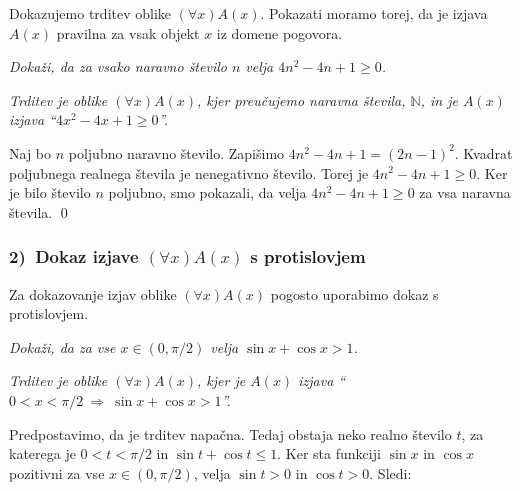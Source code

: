 \documentclass[12pt,a4paper]{article}
\def\sledi {{~\Rightarrow~}}
\def\zgled{\noindent{\bf\color{blue} Zgled: }}
\begin{document}
Dokazujemo trditev oblike $(\forall x)A(x)$.  Pokazati moramo torej, da je izjava $A(x)$
pravilna za vsak objekt $x$ iz domene pogovora.

\medskip
\zgled
{\it Dokaži, da za vsako naravno število $n$ velja $4n^2-4n+1\ge 0$.
}

\medskip {}

{\it Trditev je oblike $(\forall x)A(x)$, kjer preučujemo naravna števila, $\mathbb{N}$, in je $A(x)$ izjava ``$4x^2 -4x+1 \ge 0$''.}

Naj bo $n$ poljubno naravno število. Zapišimo $4n^2 -4n+1 = (2n-1)^2$.
Kvadrat poljubnega realnega števila je nenegativno število.
Torej je $4n^2 -4n+1\ge 0$. Ker je bilo število $n$ poljubno, smo pokazali, da velja
 $4n^2-4n+1\ge 0$ za vsa naravna števila.
\qed

\medskip
\begin{center}
\end{center}


\subsubsection*{2)~Dokaz izjave $(\forall x)A(x)$ s protislovjem}

Za dokazovanje izjav oblike $(\forall x)A(x)$  pogosto uporabimo dokaz s protislovjem.

\medskip
\zgled
{\it Dokaži, da za vse $x\in (0,\pi/2)$ velja $\sin x+\cos x>1$.
}

\medskip {}

{\it Trditev je oblike
$(\forall x)A(x)$, kjer je
$A(x)$ izjava ``$0<x<\pi/2\sledi \sin x+\cos x>1$''.}

Predpostavimo, da je trditev napačna.
Tedaj obstaja neko realno število $t$, za katerega je $0<t<\pi/2$ in $\sin t+\cos t\le 1$.
Ker sta funkciji $\sin x$ in $\cos x$ pozitivni za vse $x\in (0,\pi/2)$, velja $\sin t>0$ in $\cos t>0$.
Sledi:
\end{document}
